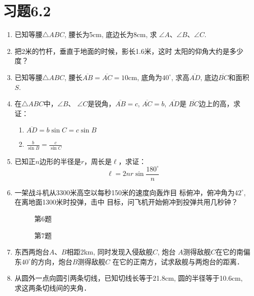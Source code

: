 \section*{习题6.2}
\begin{enumerate}
    \item 已知等腰$\triangle ABC$, 腰长为5cm, 底边长为8cm, 求
    $\angle A$、$\angle B$、$\angle C$.
    \item 把2米的竹杆，垂直于地面的时候，影长1.6米，这时
    太阳的仰角大约是多少度？
    \item  已知等腰$\triangle ABC$, 腰长$\overline{AB}=\overline{AC}=10$cm, 底角为$40^{\circ}$, 
    求高$\overline{AD}$, 底边$\overline{BC}$和面积$S$.
    \item 在$\triangle ABC$中，$\angle B$、
    $\angle C$是锐角，$\overline{AB}=c$, $\overline{AC}=b$, $\overline{AD}$是
    $\overline{BC}$边上的高，求证：
\begin{enumerate}
    \item $\overline{AD}=b\sin C=c\sin B$
    \item $\frac{b}{\sin B}=\frac{c}{\sin C}$
\end{enumerate}
\item 已知正$n$边形的半径是$r$，周长是$\ell$，求证：
\[\ell=2nr\sin\frac{180^{\circ}}{n}\]
\item  一架战斗机从3300米高空以每秒150米的速度向轰炸目
标俯冲，俯冲角为$42^{\circ}$, 在离地面1300米时投弹，击中
目标，问飞机开始俯冲到投弹共用几秒钟？
\begin{figure}[htp]\centering
    \begin{minipage}[t]{0.48\textwidth}
    \centering
{}
    \caption*{第6题}
    \end{minipage}
    \begin{minipage}[t]{0.48\textwidth}
    \centering
    \caption*{第7题}
    \end{minipage}
    \end{figure}

\item 东西两炮台$A$、$B$相距2km, 同时发现入侵敌舰$C$, 炮台
$A$测得敌舰$C$在它的南偏东$40^{\circ}$的方向，炮台$B$测得敌舰$C$
在它的正南方，试求敌舰与两炮台的距离．

\item 
从圆外一点向圆引两条切线，已知切线长等于21.8cm, 
圆的半径等于10.6cm, 求这两条切线间的夹角．
\end{enumerate}

